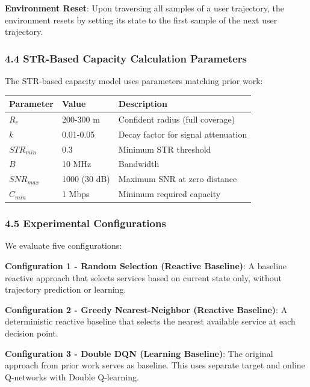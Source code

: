 \documentclass[
  10pt,
  twocolumn,
]{article}
\begin{document}
\textbf{Environment Reset}: Upon traversing all samples of a user
trajectory, the environment resets by setting its state to the first
sample of the next user trajectory.

\hypertarget{str-based-capacity-calculation-parameters}{%
	\subsubsection{4.4 STR-Based Capacity Calculation
		Parameters}\label{str-based-capacity-calculation-parameters}}

The STR-based capacity model uses parameters matching prior work:

\begin{longtable}[]{@{}lll@{}}
	\toprule\noalign{}
	Parameter     & Value        & Description                         \\
	\midrule\noalign{}
	\endhead
	\bottomrule\noalign{}
	\endlastfoot
	\(R_c\)       & 200-300 m    & Confident radius (full coverage)    \\
	\(k\)         & 0.01-0.05    & Decay factor for signal attenuation \\
	\(STR_{min}\) & 0.3          & Minimum STR threshold               \\
	\(B\)         & 10 MHz       & Bandwidth                           \\
	\(SNR_{max}\) & 1000 (30 dB) & Maximum SNR at zero distance        \\
	\(C_{min}\)   & 1 Mbps       & Minimum required capacity           \\
\end{longtable}

\hypertarget{experimental-configurations}{%
	\subsubsection{4.5 Experimental
		Configurations}\label{experimental-configurations}}

We evaluate five configurations:

\textbf{Configuration 1 - Random Selection (Reactive Baseline)}: A
baseline reactive approach that selects services based on current state
only, without trajectory prediction or learning.

\textbf{Configuration 2 - Greedy Nearest-Neighbor (Reactive Baseline)}:
A deterministic reactive baseline that selects the nearest available
service at each decision point.

\textbf{Configuration 3 - Double DQN (Learning Baseline)}: The original
approach from prior work serves as baseline. This uses separate target
and online Q-networks with Double Q-learning.
\end{document}
